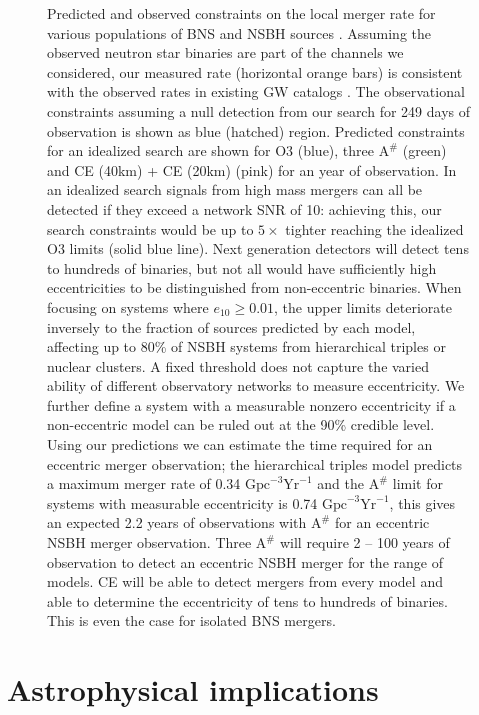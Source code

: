 \begin{figure}
    \caption{ Predicted and observed constraints on the local merger rate for various populations of BNS and NSBH sources \cite{Belczynski:2017mqx, Sedda:2020wzl,Trani:2021tan,Fragione:2018yrb}. Assuming the observed neutron star binaries are part of the channels we considered, our measured rate (horizontal orange bars) is consistent with the observed rates in existing GW catalogs \cite{Nitz:2021zwj,LIGOScientific:2021djp,Olsen:2022pin}. The observational constraints assuming a null detection from our search for 249 days of observation is shown as blue (hatched) region. Predicted constraints for an idealized search are shown for O3 (blue), three $\text{A}^{\#}$ (green) and CE (40km) + CE (20km) (pink) for an year of observation. In an idealized search signals from high mass mergers can all be detected if they exceed a network SNR of 10: achieving this, our search constraints would be up to $5\times$ tighter reaching the idealized O3 limits (solid blue line). Next generation detectors will detect tens to hundreds of binaries, but not all would have sufficiently high eccentricities to be distinguished from non-eccentric binaries. When focusing on systems where $e_{10}\geq0.01$, the upper limits deteriorate inversely to the fraction of sources predicted by each model, affecting up to 80\% of NSBH systems from hierarchical triples or nuclear clusters. A fixed threshold does not capture the varied ability of different observatory networks to measure eccentricity. We further define a system with a measurable nonzero eccentricity if a non-eccentric model can be ruled out at the 90\% credible level. Using our predictions we can estimate the time required for an eccentric merger observation; the hierarchical triples model predicts a maximum merger rate of 0.34 $\text{Gpc}^{-3}\text{Yr}^{-1}$ and the $\text{A}^{\#}$ limit for systems with measurable eccentricity is 0.74 $\text{Gpc}^{-3}\text{Yr}^{-1}$, this gives an expected 2.2 years of observations with $\text{A}^{\#}$ for an eccentric NSBH merger observation. Three $\text{A}^{\#}$ will require 2 -- 100 years of observation to detect an eccentric NSBH merger for the range of models. CE will be able to detect mergers from every model and able to determine the eccentricity of tens to hundreds of binaries. This is even the case for isolated BNS mergers.
    } 
    \label{fig:time-requirement}    
\end{figure}

\section{Astrophysical implications} 

